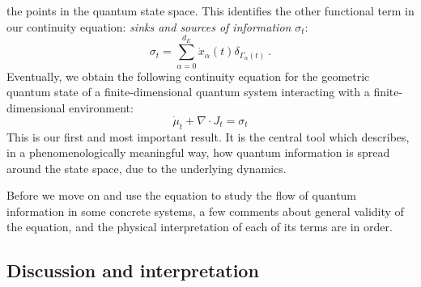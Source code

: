 \documentclass[%
 reprint,
 superscriptaddress,
 aps,
 pra,
]{revtex4-2}
\theoremstyle{definition}
\begin{document}
the points in the quantum state space. This identifies the other functional term in our continuity 
equation: \emph{sinks and sources of information} $\sigma_t$:
\begin{equation}
\sigma_t = \sum_{\alpha=0}^{d_E} \dot{x}_\alpha(t) \delta_{\Gamma_\alpha(t)}~.\label{eq:sigma}
\end{equation}
Eventually, we obtain the following continuity equation for the geometric quantum state of a finite-dimensional
quantum system interacting with a finite-dimensional environment:
\begin{equation}
\dot{\mu}_t + \nabla \cdot J_t = \sigma_t\label{eq:continuity}
\end{equation}
This is our first and most important result. It is the central tool which describes, in a phenomenologically
meaningful way, how quantum information is spread around the state space, due to the underlying dynamics.

Before we move on and use the equation to study the flow of quantum information in some concrete
systems, a few comments about general validity of the equation, and the physical interpretation of each of
its terms are in order.



\subsection*{Discussion and interpretation}
\end{document}
